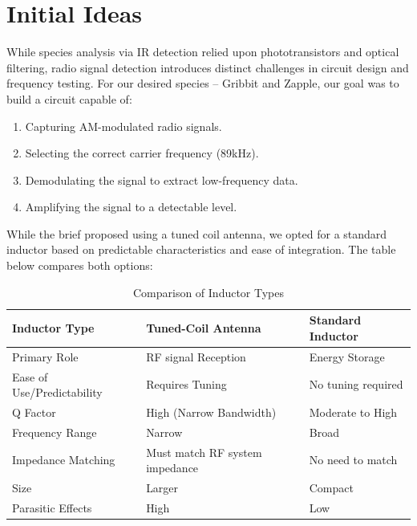 \section{Initial Ideas}

While species analysis via IR detection relied upon phototransistors and optical filtering, radio signal detection introduces distinct challenges in circuit design and frequency testing. For our desired species – Gribbit and Zapple, our goal was to build a circuit capable of:

\begin{enumerate}
    \item Capturing AM-modulated radio signals.
    \item Selecting the correct carrier frequency (89kHz).
    \item Demodulating the signal to extract low-frequency data.
    \item Amplifying the signal to a detectable level.
\end{enumerate}

While the brief proposed using a tuned coil antenna, we opted for a standard inductor based on predictable characteristics and ease of integration. The table below compares both options:

\begin{table}[H]
    \centering
    \begin{tabular}{|l|l|l|}
        \hline
        \textbf{Inductor Type}     & \textbf{Tuned-Coil Antenna}    & \textbf{Standard Inductor} \\
        \hline
        Primary Role               & RF signal Reception            & Energy Storage             \\
        Ease of Use/Predictability & Requires Tuning                & No tuning required         \\
        Q Factor                   & High (Narrow Bandwidth)        & Moderate to High           \\
        Frequency Range            & Narrow                         & Broad                      \\
        Impedance Matching         & Must match RF system impedance & No need to match           \\
        Size                       & Larger                         & Compact                    \\
        Parasitic Effects          & High                           & Low                        \\
        \hline
    \end{tabular}
    \caption{Comparison of Inductor Types}
    \label{tab:inductors}
\end{table}

